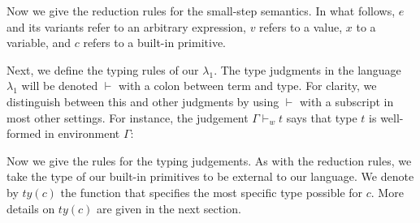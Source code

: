 \documentclass[11pt]{article}
\newcommand{\bind}{\hspace{0.05em}{:}\hspace{0.05em}} %
\newcommand{\col}{\mathbin{:}}       %
\newcommand{\step}{\hookrightarrow}
\newcommand{\Bool}{{\sf Bool}}
\newcommand{\letin}[3]{{\tt let}\,#1\hspace{0.1em}{=}\hspace{0.1em}#2\,{\tt in}\,#3}
\begin{document}
Now we give the reduction rules for the small-step semantics. In what follows, $e$ and its variants refer to an arbitrary expression, $v$ refers to a value, $x$ to a variable, and $c$  refers to a built-in primitive.

Next, we define the typing rules of our $\lambda_1$.
The type judgments in the language $\lambda_1$ will be denoted $\vdash$ with a colon between term and type. For clarity, we distinguish between this and other judgments by using $\vdash$ with a subscript in most other settings. For instance, the judgement $\Gamma \vdash_w t$ says that type $t$ is well-formed in environment $\Gamma$:


Now we give the rules for the typing judgements. As with the reduction rules, we take the type of our built-in primitives to be external to our language. We denote by $ty(c)$ the function that specifies the most specific type possible for $c$. More details on $ty(c)$ are given in the next section.
\end{document}
